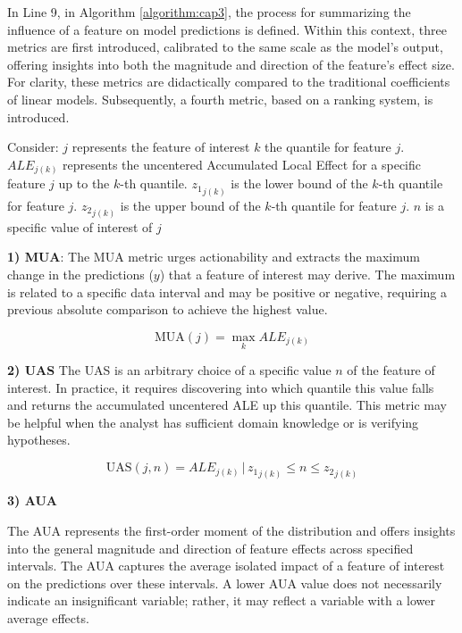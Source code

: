 In Line 9, in Algorithm \ref{algorithm:cap3}, the process for summarizing the influence of a feature on model predictions is defined. Within this context, three metrics are first introduced, calibrated to the same scale as the model's output, offering insights into both the magnitude and direction of the feature's effect size. For clarity, these metrics are didactically compared to the traditional coefficients of linear models. Subsequently, a fourth metric, based on a ranking system, is introduced.

Consider:
\( j \) represents the feature of interest
\( k \) the quantile for feature \( j \).
\( ALE_{j(k)} \) represents the uncentered Accumulated Local Effect for a specific feature \( j \) up to the \( k \)-th quantile.
\( {z_1}_{j(k)} \) is the lower bound of the \( k \)-th quantile for feature \( j \).
\( {z_2}_{j(k)} \) is the upper bound of the \( k \)-th quantile for feature \( j \).
\( n \) is a specific value of interest of \( j \) 

\textbf{1) \gls{MUA}}: The \gls{MUA} metric urges actionability and extracts the maximum change in the predictions (\(y\)) that a feature of interest may derive. The maximum is related to a specific data interval and may be positive or negative, requiring a previous absolute comparison to achieve the highest value.


\begin{equation}
\label{eq:MUA}
\text{MUA}(j) = \max_{k} ALE_{j(k)}
\end{equation}


\textbf{2) \gls{UAS}}
The \gls{UAS} is an arbitrary choice of a specific value \(n\) of the feature of interest. In practice, it requires discovering into which quantile this value falls and returns the accumulated uncentered ALE up this quantile. This metric may be helpful when the analyst has sufficient domain knowledge or is verifying hypotheses.

\begin{equation}
\label{eq:UAS}
\text{UAS}(j, n) = ALE_{j(k)} \, | \, {z_1}_{j(k)} \leq n \leq {z_2}_{j(k)}
\end{equation}

\textbf{3) \gls{AUA}}

The \gls{AUA} represents the first-order moment of the distribution and offers insights into the general magnitude and direction of feature effects across specified intervals. The \gls{AUA} captures the average isolated impact of a feature of interest on the predictions over these intervals. A lower \gls{AUA} value does not necessarily indicate an insignificant variable; rather, it may reflect a variable with a lower average effects. 


